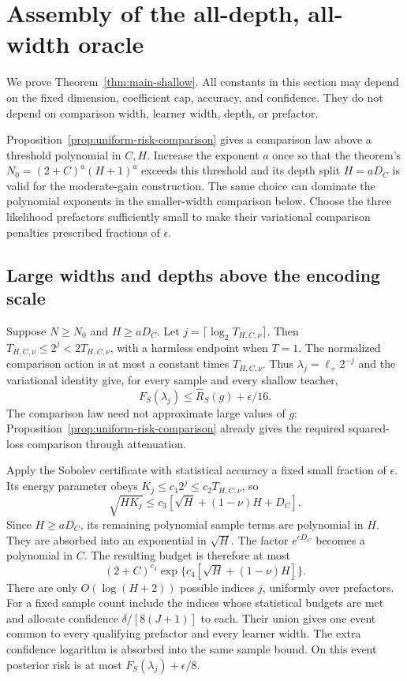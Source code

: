 \section{Assembly of the all-depth, all-width oracle}
\label{sec:assembly-shallow}
We prove Theorem~\ref{thm:main-shallow}. All constants in this section may depend on the fixed dimension, coefficient cap, accuracy, and confidence. They do not depend on comparison width, learner width, depth, or prefactor.

Proposition~\ref{prop:uniform-risk-comparison} gives a comparison law above a threshold polynomial in $C,H$. Increase the exponent $a$ once so that the theorem's $N_0=(2+C)^a(H+1)^a$ exceeds this threshold and its depth split $H=aD_C$ is valid for the moderate-gain construction. The same choice can dominate the polynomial exponents in the smaller-width comparison below. Choose the three likelihood prefactors sufficiently small to make their variational comparison penalties prescribed fractions of $\epsilon$.

\subsection{Large widths and depths above the encoding scale}
Suppose $N\ge N_0$ and $H\ge aD_C$. Let $j=\lceil\log_2T_{H,C,\nu}\rceil$. Then
$T_{H,C,\nu}\le2^j<2T_{H,C,\nu}$, with a harmless endpoint when $T=1$. The normalized comparison action is at most a constant times $T_{H,C,\nu}$. Thus $\lambda_j=\ell_+2^{-j}$ and the variational identity give, for every sample and every shallow teacher,
\begin{equation}
 F_S(\lambda_j)\le\widehat R_S(g)+\epsilon/16.
 \label{eq:shallow-evidence-comparison}
\end{equation}
The comparison law need not approximate large values of $g$: Proposition~\ref{prop:uniform-risk-comparison} already gives the required squared-loss comparison through attenuation.

Apply the Sobolev certificate with statistical accuracy a fixed small fraction of $\epsilon$. Its energy parameter obeys
$K_j\le c_1 2^j\le c_2T_{H,C,\nu}$, so
\[
 \sqrt{HK_j}\le c_3[\sqrt H+(1-\nu)H+D_C].
\]
Since $H\ge aD_C$, its remaining polynomial sample terms are polynomial in $H$. They are absorbed into an exponential in $\sqrt H$. The factor $e^{cD_C}$ becomes a polynomial in $C$. The resulting budget is therefore at most
\[
 (2+C)^{c_4}\exp\{c_4[\sqrt H+(1-\nu)H]\}.
\]
There are only $O(\log(H+2))$ possible indices $j$, uniformly over prefactors. For a fixed sample count include the indices whose statistical budgets are met and allocate confidence $\delta/[8(J+1)]$ to each. Their union gives one event common to every qualifying prefactor and every learner width. The extra confidence logarithm is absorbed into the same sample bound. On this event posterior risk is at most $F_S(\lambda_j)+\epsilon/8$.

